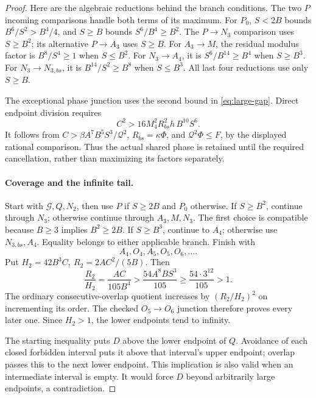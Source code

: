 \documentclass[12pt]{article}
\numberwithin{equation}{section}
\begin{document}
\begin{proof}
Here are the algebraic reductions behind the branch conditions.
The two \(P\) incoming comparisons handle both terms of its maximum.
For \(P_0\), \(S<2B\) bounds \(B^6/S^2>B^4/4\), and \(S\ge B\)
bounds \(S^6/B^4\ge B^2\). The \(P\to N_3\) comparison uses
\(S\ge B^2\); its alternative \(P\to A_3\) uses \(S\ge B\).
For \(A_3\to M\), the residual modulus factor is \(B^8/S^4\ge1\)
when \(S\le B^2\). For \(N_3\to A_4\), it is \(S^6/B^{14}\ge B^4\)
when \(S\ge B^3\). For \(N_3\to N_{3,bs}\), it is
\(B^{14}/S^2\ge B^8\) when \(S\le B^3\).
All last four reductions use only \(S\ge B\).

The exceptional phase junction uses the second bound in
\eqref{eq:large-gap}. Direct endpoint division requires
\[
 C^2>16M_4^2R_{bs}^2h\,B^{10}S^6.
\]
It follows from \(C>\beta A^7B^5S^3/\mathcal Q^2\),
\(R_{bs}=\kappa\Phi\), and \(\mathcal Q^2\Phi\le F\), by the
displayed rational comparison. Thus the actual shared phase is retained
until the required cancellation, rather than maximizing its factors separately.

\paragraph{Coverage and the infinite tail.}
Start with \(\mathcal G,Q,N_2\), then use \(P\) if \(S\ge2B\) and
\(P_0\) otherwise. If \(S\ge B^2\), continue through \(N_3\);
otherwise continue through \(A_3,M,N_3\). The first choice is compatible
because \(B\ge3\) implies \(B^2\ge2B\).
If \(S\ge B^3\), continue to \(A_4\); otherwise use \(N_{3,bs},A_4\).
Equality belongs to either applicable branch. Finish with
\[
 A_4,O_4,A_5,O_5,O_6,\ldots .
\]
Put \(H_2=42B^3C,\ R_2=2AC^2/(5B)\). Then
\[
 \frac{R_2}{H_2}=\frac{AC}{105B^4}>
 \frac{54A^8BS^3}{105}\ge\frac{54\cdot3^{12}}{105}>1.
\]
The ordinary consecutive-overlap quotient increases by
\((R_2/H_2)^2\) on incrementing its order. The checked \(O_5\to O_6\)
junction therefore proves every later one. Since \(H_2>1\), the lower
endpoints tend to infinity.

The starting inequality puts \(D\) above the lower endpoint of \(Q\).
Avoidance of each closed forbidden interval puts it above that interval's
upper endpoint; overlap passes this to the next lower endpoint.
This implication is also valid when an intermediate interval is empty.
It would force \(D\) beyond arbitrarily large endpoints, a contradiction.
\end{proof}
\end{document}
